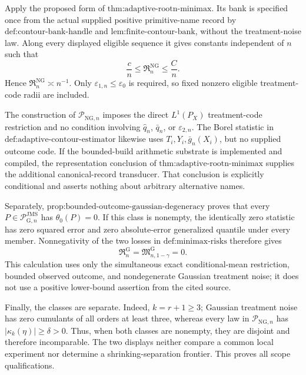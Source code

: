 Apply the proposed form of \(\text{thm:adaptive-rootn-minimax}\).  Its bank is specified once from the actual supplied positive primitive-name record by \(\text{def:contour-bank-handle}\) and \(\text{lem:finite-contour-bank}\), without the treatment-noise law.  Along every displayed eligible sequence it gives constants independent of \(n\) such that
\[
 \frac cn\le\mathfrak R_n^{\mathrm{NG}}\le\frac Cn.
\]
Hence \(\mathfrak R_n^{\mathrm{NG}}\asymp n^{-1}\).  Only \(\varepsilon_{1,n}\le\varepsilon_0\) is required, so fixed nonzero eligible treatment-code radii are included.

The construction of \(\mathcal P_{\mathrm{NG},n}\) imposes the direct \(L^1(P_X)\) treatment-code restriction and no condition involving \(\widehat q_n\), \(\bar q_n\), or \(\varepsilon_{2,n}\).  The Borel statistic in \(\text{def:adaptive-contour-estimator}\) likewise uses \(T_i,Y_i,\bar g_n(X_i)\), but no supplied outcome code.  If the bounded-build arithmetic substrate is implemented and compiled, the representation conclusion of \(\text{thm:adaptive-rootn-minimax}\) supplies the additional canonical-record transducer.  That conclusion is explicitly conditional and asserts nothing about arbitrary alternative names.

Separately, \(\text{prop:bounded-outcome-gaussian-degeneracy}\) proves that every \(P\in\mathcal P_{\mathrm G,n}^{\mathrm{JMS}}\) has \(\theta_0(P)=0\).  If this class is nonempty, the identically zero statistic has zero squared error and zero absolute-error generalized quantile under every member.  Nonnegativity of the two losses in \(\text{def:minimax-risks}\) therefore gives
\[
 \mathfrak R_n^{\mathrm G}
 =\mathfrak M_{n,1-\gamma}^{\mathrm G}=0.
\]
This calculation uses only the simultaneous exact conditional-mean restriction, bounded observed outcome, and nondegenerate Gaussian treatment noise; it does not use a positive lower-bound assertion from the cited source.

Finally, the classes are separate.  Indeed, \(k=r+1\ge3\); Gaussian treatment noise has zero cumulants of all orders at least three, whereas every law in \(\mathcal P_{\mathrm{NG},n}\) has \(|\kappa_k(\eta)|\ge\delta>0\).  Thus, when both classes are nonempty, they are disjoint and therefore incomparable.  The two displays neither compare a common local experiment nor determine a shrinking-separation frontier.  This proves all scope qualifications.